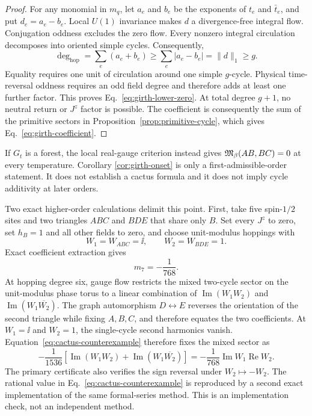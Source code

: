 \begin{proof}
For any monomial in $m_q$, let $a_e$ and $b_e$ be the exponents of $t_e$ and
$\bar t_e$, and put $d_e=a_e-b_e$.  Local $U(1)$ invariance makes $d$ a
divergence-free integral flow.  Conjugation oddness excludes the zero flow.
Every nonzero integral circulation decomposes into oriented simple cycles.
Consequently,
\begin{equation*}
 \deg_{\mathrm{hop}}
 =\sum_e(a_e+b_e)
 \geq\sum_e|a_e-b_e|
 =\lVert d\rVert_1
 \geq g.
\end{equation*}
Equality requires one unit of circulation around one simple $g$-cycle.
Physical time-reversal oddness requires an odd field degree and therefore
adds at least one further factor.  This proves
Eq.~\eqref{eq:girth-lower-zero}.  At total degree $g+1$, no neutral return or
$J^z$ factor is possible.  The coefficient is consequently the sum of the
primitive sectors in Proposition~\ref{prop:primitive-cycle}, which
gives Eq.~\eqref{eq:girth-coefficient}.
\end{proof}

If $G_t$ is a forest, the local real-gauge criterion instead gives
$\mathfrak{M}_\beta(AB,BC)=0$ at every temperature.  Corollary
\ref{cor:girth-onset} is only a first-admissible-order statement.  It
does not establish a cactus formula and it does not imply cycle additivity
at later orders.

Two exact higher-order calculations delimit this point.  First, take five
spin-$1/2$ sites and two triangles $ABC$ and $BDE$ that share only $B$.
Set every $J^z$ to zero, set $h_B=1$ and all other fields to zero, and choose
unit-modulus hoppings with
\begin{equation}
 W_1=W_{ABC}=\ii,
 \qquad
 W_2=W_{BDE}=1.
\end{equation}
Exact coefficient extraction gives
\begin{equation}
 m_7=-\frac1{768}.
 \label{eq:cactus-counterexample}
\end{equation}
At hopping degree six, gauge flow restricts the mixed two-cycle sector on the
unit-modulus phase torus to a linear combination of
$\operatorname{Im}(W_1W_2)$ and
$\operatorname{Im}(W_1\overline{W_2})$.  The graph automorphism
$D\leftrightarrow E$ reverses the orientation of the second triangle while
fixing $A,B,C$, and therefore equates the two coefficients.  At $W_1=\ii$
and $W_2=1$, the single-cycle second harmonics
vanish.  Equation~\eqref{eq:cactus-counterexample} therefore fixes the mixed
sector as
\begin{equation}
 -\frac1{1536}
 \left[
 \operatorname{Im}(W_1W_2)
 +\operatorname{Im}(W_1\overline{W_2})
 \right]
 =-\frac1{768}\operatorname{Im}W_1\operatorname{Re}W_2.
 \label{eq:cactus-mixed-sector}
\end{equation}
The primary certificate also verifies the sign reversal under $W_2\mapsto
-W_2$.  The rational value in Eq.~\eqref{eq:cactus-counterexample} is
reproduced by a second exact implementation of the same formal-series method.
This is an implementation check, not an independent method.

